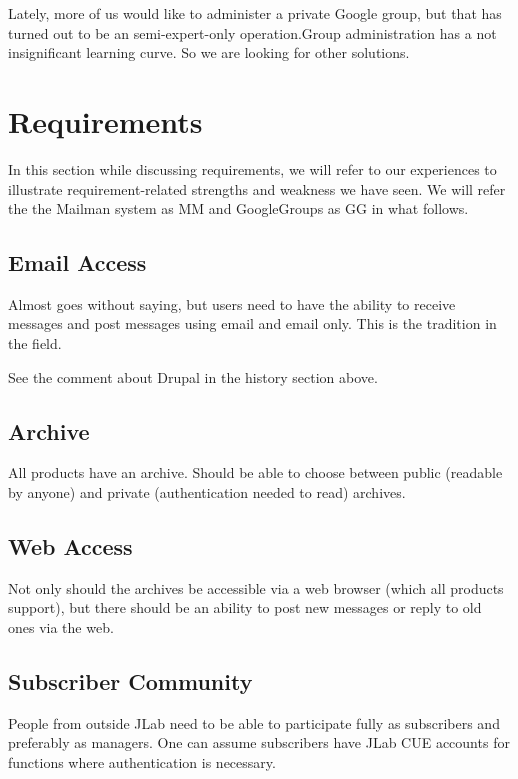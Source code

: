 \documentclass{article}
\begin{document}
Lately, more of us would like to administer a private Google group, but that
has turned out to be an semi-expert-only operation.Group administration has
a not insignificant learning curve. So we are looking for
other solutions.

\section{Requirements}

In this section while discussing requirements, we will refer to our
experiences to illustrate requirement-related strengths and weakness
we have seen. We will refer the the Mailman system as MM and
GoogleGroups as GG in what follows.

\subsection{Email Access}

Almost goes without saying, but users need to have the ability to
receive messages and post messages using email and email only. This is
the tradition in the field.

See the comment about Drupal in the history section above.

\subsection{Archive}

All products have an archive. Should be able to choose between public
(readable by anyone) and private (authentication needed to read)
archives.

\subsection{Web Access}

Not only should the archives be accessible via a web browser (which
all products support), but there should be an ability to post new
messages or reply to old ones via the web.

\subsection{Subscriber Community}

People from outside JLab need to be able to participate fully as
subscribers and preferably as managers. One can assume subscribers
have JLab CUE accounts for functions where authentication is
necessary.
\end{document}
